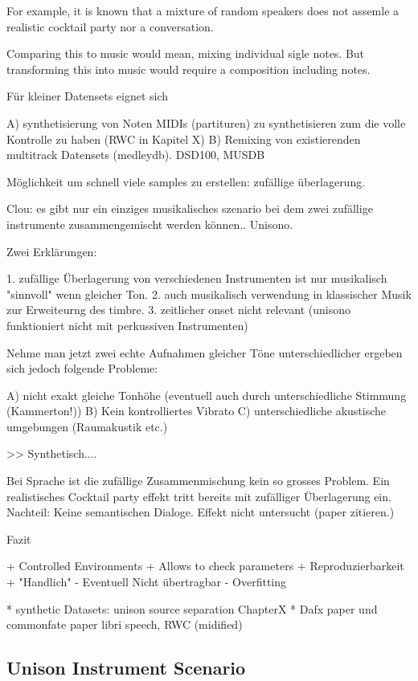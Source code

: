 For example, it is known that a mixture of random speakers does not assemle a realistic cocktail party nor a conversation.

Comparing this to music would mean, mixing individual sigle notes. But transforming this into music would require a composition including notes.

Für kleiner Datensets eignet sich

A) synthetisierung von Noten MIDIs (partituren) zu synthetisieren zum die volle Kontrolle zu haben (RWC in Kapitel X)
B) Remixing von existierenden multitrack Datensets (medleydb). DSD100, MUSDB

Möglichkeit um schnell viele samples zu erstellen: zufällige überlagerung.

Clou: es gibt nur ein einziges musikalisches szenario bei dem zwei zufällige instrumente zusammengemischt werden können.. Unisono.

Zwei Erklärungen:

1. zufällige Überlagerung von verschiedenen Instrumenten ist nur musikalisch "sinnvoll" wenn gleicher Ton.
2. auch musikalisch verwendung in klassischer Musik zur Erweiteurng des timbre.
3. zeitlicher onset nicht relevant (unisono funktioniert nicht mit perkussiven Instrumenten)

Nehme man jetzt zwei echte Aufnahmen gleicher Töne unterschiedlicher ergeben sich jedoch folgende Probleme:

A) nicht exakt gleiche Tonhöhe (eventuell auch durch unterschiedliche Stimmung (Kammerton!))
B) Kein kontrolliertes Vibrato
C) unterschiedliche akustische umgebungen (Raumakustik etc.)

>> Synthetisch....

Bei Sprache ist die zufällige Zusammenmischung kein so grosses Problem. Ein realistisches Cocktail party effekt tritt bereits mit zufälliger Überlagerung ein. Nachteil: Keine semantischen Dialoge. Effekt nicht untersucht (paper zitieren.)

Fazit

+ Controlled Environments
+ Allows to check parameters
+ Reproduzierbarkeit
+ "Handlich"
- Eventuell Nicht übertragbar
- Overfitting

* synthetic Datasets: unison source separation Chapter{X}
* Dafx paper und commonfate paper
libri speech, RWC (midified)

\subsection{Unison Instrument Scenario}
\label{sec:scenario}


